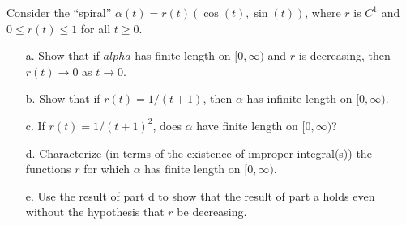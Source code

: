 \documentclass[Shifrin_Solutions_Spring_2018]{subfiles}
\begin{document}
\begin{exercise}
Consider the ``spiral'' $\alpha(t) = r(t) (\cos(t), \sin(t))$, where $r$ is 
$C^1$ and $0\leq r(t) \leq 1$ for all $t\geq 0$.
\begin{itemize}
\item[a.] Show that if $alpha$ has finite length on $[0,\infty)$ and $r$ is decreasing, 
then $r(t) \rightarrow 0$ as $t \rightarrow 0$.
\item[b.] Show that if $r(t) = 1/(t+1)$, then $\alpha$ has infinite length on $[0,\infty)$.
\item[c.] If $r(t) = 1/(t+1)^2$, does $\alpha$ have finite length on $[0,\infty)$?
\item[d.] Characterize (in terms of the existence of improper integral(s)) the functions 
$r$ for which $\alpha$ has finite length on $[0,\infty)$.
\item[e.] Use the result of part d to show that the result of part a holds even
without the hypothesis that $r$ be decreasing.
\end{itemize}
\end{exercise}
\end{document}
